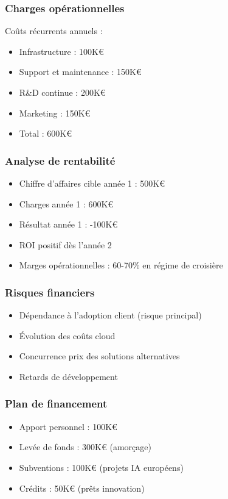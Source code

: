 \documentclass[12pt,a4paper]{report}
\begin{document}
\subsubsection{Charges opérationnelles}

Coûts récurrents annuels :
\begin{itemize}
\item Infrastructure : 100K€
\item Support et maintenance : 150K€
\item R\&D continue : 200K€
\item Marketing : 150K€
\item Total : 600K€
\end{itemize}

\subsubsection{Analyse de rentabilité}

\begin{itemize}
\item Chiffre d'affaires cible année 1 : 500K€
\item Charges année 1 : 600K€
\item Résultat année 1 : -100K€
\item ROI positif dès l'année 2
\item Marges opérationnelles : 60-70\% en régime de croisière
\end{itemize}

\subsubsection{Risques financiers}

\begin{itemize}
\item Dépendance à l'adoption client (risque principal)
\item Évolution des coûts cloud
\item Concurrence prix des solutions alternatives
\item Retards de développement
\end{itemize}

\subsubsection{Plan de financement}

\begin{itemize}
\item Apport personnel : 100K€
\item Levée de fonds : 300K€ (amorçage)
\item Subventions : 100K€ (projets IA européens)
\item Crédits : 50K€ (prêts innovation)
\end{itemize}
\end{document}
